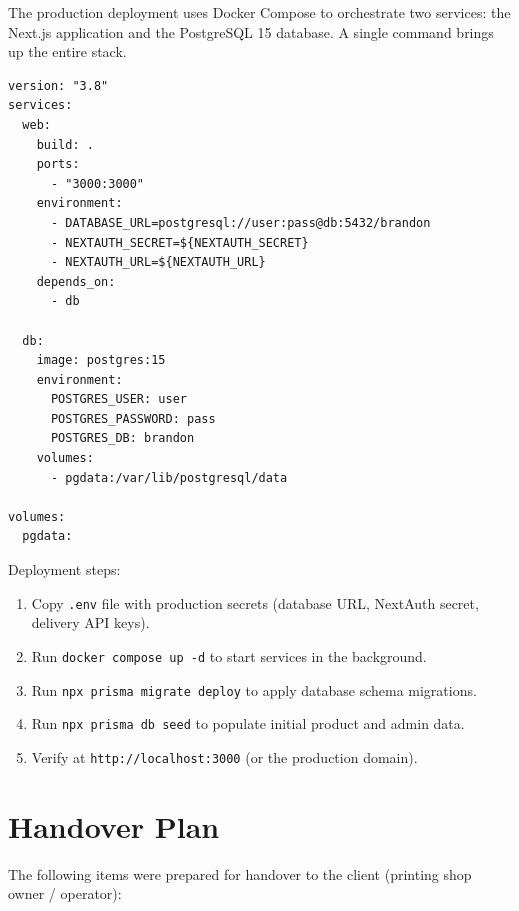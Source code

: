 \documentclass[12pt,a4paper]{report}
\begin{document}
The production deployment uses Docker Compose to orchestrate two services: the Next.js application and the PostgreSQL 15 database. A single command brings up the entire stack.

\begin{verbatim}
version: "3.8"
services:
  web:
    build: .
    ports:
      - "3000:3000"
    environment:
      - DATABASE_URL=postgresql://user:pass@db:5432/brandon
      - NEXTAUTH_SECRET=${NEXTAUTH_SECRET}
      - NEXTAUTH_URL=${NEXTAUTH_URL}
    depends_on:
      - db

  db:
    image: postgres:15
    environment:
      POSTGRES_USER: user
      POSTGRES_PASSWORD: pass
      POSTGRES_DB: brandon
    volumes:
      - pgdata:/var/lib/postgresql/data

volumes:
  pgdata:
\end{verbatim}

Deployment steps:
\begin{enumerate}
  \item Copy \texttt{.env} file with production secrets (database URL, NextAuth secret, delivery API keys).
  \item Run \texttt{docker compose up -d} to start services in the background.
  \item Run \texttt{npx prisma migrate deploy} to apply database schema migrations.
  \item Run \texttt{npx prisma db seed} to populate initial product and admin data.
  \item Verify at \texttt{http://localhost:3000} (or the production domain).
\end{enumerate}

\section{Handover Plan}

The following items were prepared for handover to the client (printing shop owner / operator):
\end{document}
